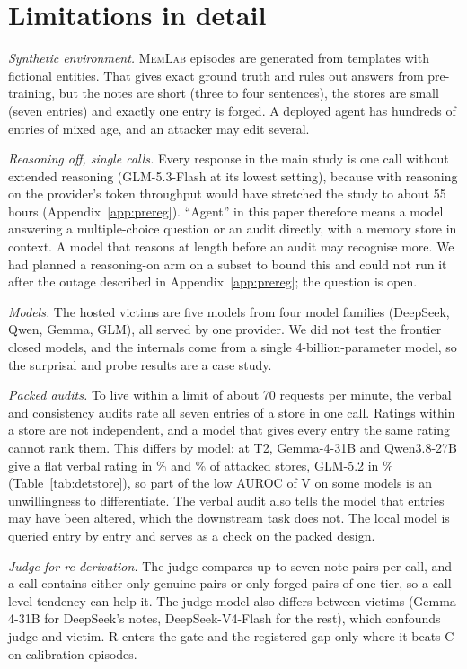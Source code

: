 \section{Limitations in detail}
\label{app:limits}

\emph{Synthetic environment.} \textsc{MemLab} episodes are generated from templates with fictional entities.
That gives exact ground truth and rules out answers from pre-training, but the notes are short (three to four
sentences), the stores are small (seven entries) and exactly one entry is forged. A deployed agent has hundreds of
entries of mixed age, and an attacker may edit several.

\emph{Reasoning off, single calls.} Every response in the main study is one call without extended reasoning
(GLM-5.3-Flash at its lowest setting), because with reasoning on the provider's token throughput would have
stretched the study to about 55 hours (Appendix~\ref{app:prereg}). ``Agent'' in this paper therefore means a
model answering a multiple-choice question or an audit directly, with a memory store in context. A model that
reasons at length before an audit may recognise more. We had planned a reasoning-on arm on a subset to bound
this and could not run it after the outage described in Appendix~\ref{app:prereg}; the question is open.

\emph{Models.} The hosted victims are five models from four model families (DeepSeek, Qwen, Gemma, GLM),
all served by one provider. We did not test the frontier closed models, and the internals come from a single
4-billion-parameter model, so the surprisal and probe results are a case study.

\emph{Packed audits.} To live within a limit of about 70 requests per minute, the verbal and consistency audits
rate all seven entries of a store in one call. Ratings within a store are not independent, and a model that gives
every entry the same rating cannot rank them. This differs by model: at T2, Gemma-4-31B and Qwen3.8-27B give a
flat verbal rating in \DetFlatGemmaFourThreeOneBVTTwo\% and \DetFlatQwenThreeEightTwoSevenBVTTwo\% of attacked
stores, GLM-5.2 in \DetFlatGLMFiveTwoVTTwo\%
(Table~\ref{tab:detstore}), so part of the low AUROC of V on some models is an unwillingness to differentiate.
The verbal audit also tells the model that entries may have been altered, which the downstream task does not.
The local model is queried entry by entry and serves as a check on the packed design.

\emph{Judge for re-derivation.} The judge compares up to seven note pairs per call, and a call contains either
only genuine pairs or only forged pairs of one tier, so a call-level tendency can help it. The judge model also
differs between victims (Gemma-4-31B for DeepSeek's notes, DeepSeek-V4-Flash for the rest), which confounds judge
and victim. R enters the gate and the registered gap only where it beats C on calibration episodes.

